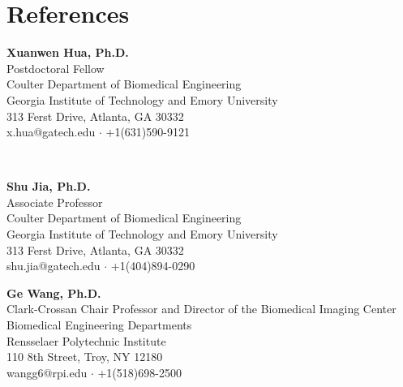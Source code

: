 \documentclass[letterpaper, 11pt]{article}
\newcommand{\subsectionvspace}{\vspace{8pt}}
\begin{document}
\section{References}


    \begin{minipage}[t]{0.48\textwidth} 
        \textbf{Xuanwen Hua, Ph.D.} \\
        Postdoctoral Fellow \\
        Coulter Department of Biomedical Engineering \\
        Georgia Institute of Technology and Emory University \\
        313 Ferst Drive, Atlanta, GA 30332 \\
        x.hua@gatech.edu $\cdot$ +1(631)590-9121
    \end{minipage}%
    \begin{minipage}[t]{0.04\textwidth}
        \
    \end{minipage}%
    \begin{minipage}[t]{0.48\textwidth}
        \textbf{Shu Jia, Ph.D.} \\
        Associate Professor \\
        Coulter Department of Biomedical Engineering \\
        Georgia Institute of Technology and Emory University \\
        313 Ferst Drive, Atlanta, GA 30332 \\
        shu.jia@gatech.edu $\cdot$ +1(404)894-0290
    \end{minipage}

    \subsectionvspace

    \textbf{Ge Wang, Ph.D.} \\
    Clark-Crossan Chair Professor and Director of the Biomedical Imaging Center \\
    Biomedical Engineering Departments \\
    Rensselaer Polytechnic Institute \\
    110 8th Street, Troy, NY 12180 \\
    wangg6@rpi.edu $\cdot$ +1(518)698-2500
\end{document}

